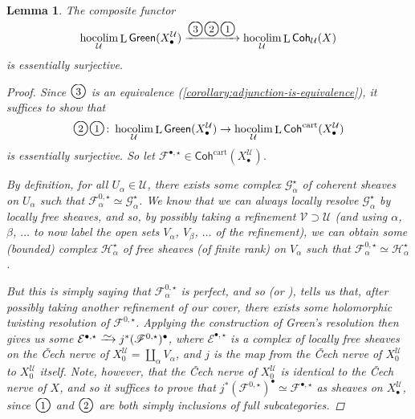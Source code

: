 \documentclass[11pt,fleqn]{article}
\theoremstyle{plain}
\newtheorem{lemma}[theorem]{Lemma}
\theoremstyle{definition}
\theoremstyle{remark}
\numberwithin{equation}{theorem}
\newcommand{\cover}{\mathcal{U}}
\newcommand{\anothercover}{\mathcal{V}}
\newcommand{\anotherbullet}{\star}
\newcommand{\congto}{\xrightarrow{\raisebox{-.5ex}[0ex][0ex]{$\sim$}}}
\newcommand{\gcohUX}{\mathsf{Coh}_{\cover}(X)}
\newcommand{\cartcohX}{\mathsf{Coh}^\mathrm{cart}(X_\bullet^\cover)}
\newcommand{\greenX}{\mathsf{Green}(X_\bullet^\cover)}
\newcommand{\nerve}[1]{X_{#1}^\cover}
\newcommand{\numberincircle}[1]{\text{\normalfont\Large\textcircled{\small #1}}}
\DeclareMathOperator{\LL}{L}
\DeclareMathOperator{\hocolim}{hocolim}
\begin{document}
        \begin{lemma}\label{lemma:green-gives-essential-surjectivity}
            The composite functor
            \begin{equation*}
                \hocolim_\cover\LL{\greenX}
                \xrightarrow{\numberincircle{3}\numberincircle{2}\numberincircle{1}}
                \hocolim_\cover\LL{\gcohUX}
            \end{equation*}
            is essentially surjective.
            \begin{proof}
                Since $\numberincircle{3}$ is an equivalence (\cref{corollary:adjunction-is-equivalence}), it suffices to show that
                \[
                    \numberincircle{2}\numberincircle{1}\colon
                    \hocolim_\cover\LL{\greenX}
                    \to
                    \hocolim_\cover\LL{\cartcohX}
                \]
                is essentially surjective.
                So let $\mathscr{F}^{\bullet,\anotherbullet}\in\cartcohX$.

                By definition, for all $U_\alpha\in\cover$, there exists some complex $\mathscr{G}_{\alpha}^\anotherbullet$ of coherent sheaves on $U_\alpha$ such that $\mathscr{F}^{0,\anotherbullet}_\alpha \simeq \mathscr{G}_\alpha^\anotherbullet$.
                We know that we can always locally resolve $\mathscr{G}_\alpha^\anotherbullet$ by locally free sheaves, and so, by possibly taking a refinement $\anothercover\supset\cover$ (and using $\alpha$, $\beta$, $\ldots$ to now label the open sets $V_\alpha$, $V_\beta$, $\ldots$ of the refinement), we can obtain some (bounded) complex $\mathscr{H}_\alpha^\anotherbullet$ of free sheaves (of finite rank) on $V_\alpha$ such that $\mathscr{F}_\alpha^{0,\anotherbullet} \simeq \mathscr{H}_\alpha^\anotherbullet$.

                But this is simply saying that $\mathscr{F}_\alpha^{0,\anotherbullet}$ is {perfect}, and so \cite[Proposition~1.2.3]{OBrian&etal1985} (or \cite[Proposition~3.20]{Wei2016}), tells us that, after possibly taking another refinement of our cover, there exists some holomorphic twisting resolution of $\mathscr{F}^{0,\anotherbullet}$.
                Applying the construction of Green's resolution then gives us some $\mathcal{E}^{\bullet,\anotherbullet}\congto j^*(\mathscr{F}^{0,\anotherbullet})^\bullet$, where $\mathcal{E}^{\bullet,\anotherbullet}$ is a complex of locally free sheaves on the Čech nerve of $\nerve{0}=\coprod_\alpha V_\alpha$, and $j$ is the map from the Čech nerve of $\nerve{0}$ to $\nerve{0}$ itself.
                Note, however, that the Čech nerve of $\nerve{0}$ is identical to the Čech nerve of $X$, and so it suffices to prove that $j^*(\mathscr{F}^{0,\anotherbullet})^\bullet\simeq\mathscr{F}^{\bullet,\anotherbullet}$ as sheaves on $\nerve{\bullet}$, since $\numberincircle{1}$ and $\numberincircle{2}$ are both simply inclusions of full subcategories.


\end{proof}
\end{lemma}
\end{document}
